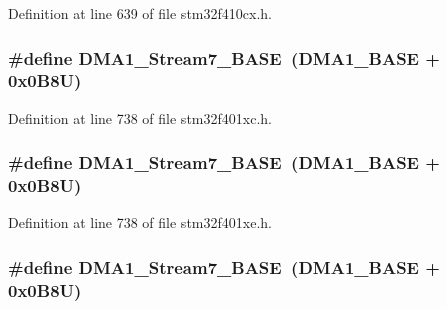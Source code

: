 Definition at line 639 of file stm32f410cx.\+h.

\subsubsection[{\texorpdfstring{D\+M\+A1\+\_\+\+Stream7\+\_\+\+B\+A\+SE}{DMA1_Stream7_BASE}}]{\setlength{\rightskip}{0pt plus 5cm}\#define D\+M\+A1\+\_\+\+Stream7\+\_\+\+B\+A\+SE~({\bf D\+M\+A1\+\_\+\+B\+A\+SE} + 0x0\+B8\+U)}\hypertarget{group___peripheral__registers__structures_ga82186dd6d3f60995d428b34c041919d7}{}\label{group___peripheral__registers__structures_ga82186dd6d3f60995d428b34c041919d7}


Definition at line 738 of file stm32f401xc.\+h.

\subsubsection[{\texorpdfstring{D\+M\+A1\+\_\+\+Stream7\+\_\+\+B\+A\+SE}{DMA1_Stream7_BASE}}]{\setlength{\rightskip}{0pt plus 5cm}\#define D\+M\+A1\+\_\+\+Stream7\+\_\+\+B\+A\+SE~({\bf D\+M\+A1\+\_\+\+B\+A\+SE} + 0x0\+B8\+U)}\hypertarget{group___peripheral__registers__structures_ga82186dd6d3f60995d428b34c041919d7}{}\label{group___peripheral__registers__structures_ga82186dd6d3f60995d428b34c041919d7}


Definition at line 738 of file stm32f401xe.\+h.

\subsubsection[{\texorpdfstring{D\+M\+A1\+\_\+\+Stream7\+\_\+\+B\+A\+SE}{DMA1_Stream7_BASE}}]{\setlength{\rightskip}{0pt plus 5cm}\#define D\+M\+A1\+\_\+\+Stream7\+\_\+\+B\+A\+SE~({\bf D\+M\+A1\+\_\+\+B\+A\+SE} + 0x0\+B8\+U)}\hypertarget{group___peripheral__registers__structures_ga82186dd6d3f60995d428b34c041919d7}{}\label{group___peripheral__registers__structures_ga82186dd6d3f60995d428b34c041919d7}


